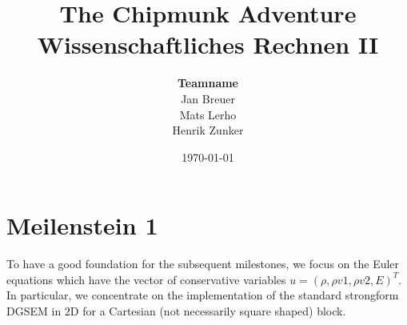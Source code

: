 \documentclass[11pt]{scrartcl}
\begin{document}


\title{{\Huge The Chipmunk Adventure} \\[18pt]
Wissenschaftliches Rechnen II \\[18pt]}
\author{ \textbf{Teamname} \\
Jan Breuer\\
Mats Lerho \\
Henrik Zunker}
\date{\today}

\maketitle



\thispagestyle{empty} %


% 

\newpage
\tableofcontents
\thispagestyle{empty}
\newpage

\section{Meilenstein 1}
To have a good foundation for the subsequent milestones, we focus on the Euler equations which have the vector of conservative variables $u=(\rho, \rho v1, \rho v2, E)^T$. In particular, we concentrate on the implementation of the standard strongform DGSEM in $2$D for a Cartesian (not necessarily square shaped) block.
\end{document}
